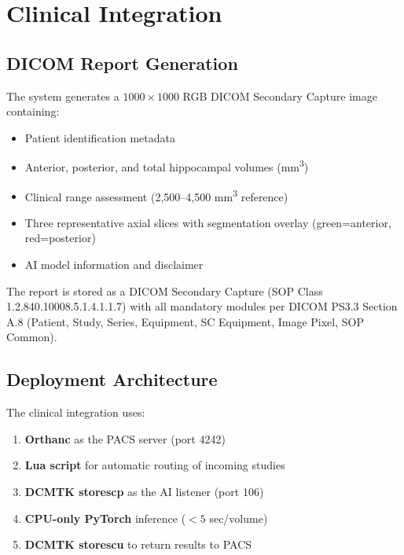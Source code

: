 \documentclass[12pt,a4paper,twocolumn]{article}
\begin{document}
\section{Clinical Integration}

\subsection{DICOM Report Generation}

The system generates a $1000 \times 1000$ RGB DICOM Secondary Capture image containing:
\begin{itemize}[nosep]
    \item Patient identification metadata
    \item Anterior, posterior, and total hippocampal volumes (mm\textsuperscript{3})
    \item Clinical range assessment (2,500--4,500 mm\textsuperscript{3} reference)
    \item Three representative axial slices with segmentation overlay (green=anterior, red=posterior)
    \item AI model information and disclaimer
\end{itemize}

The report is stored as a DICOM Secondary Capture (SOP Class 1.2.840.10008.5.1.4.1.1.7) with all mandatory modules per DICOM PS3.3 Section A.8 (Patient, Study, Series, Equipment, SC Equipment, Image Pixel, SOP Common).

\subsection{Deployment Architecture}

The clinical integration uses:
\begin{enumerate}[nosep]
    \item \textbf{Orthanc} as the PACS server (port 4242)
    \item \textbf{Lua script} for automatic routing of incoming studies
    \item \textbf{DCMTK storescp} as the AI listener (port 106)
    \item \textbf{CPU-only PyTorch} inference ($<5$ sec/volume)
    \item \textbf{DCMTK storescu} to return results to PACS
\end{enumerate}
\end{document}
